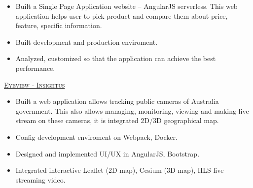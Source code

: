 \begin{cventries}
{\begin{itemize}
        \item {Built a Single Page Application website – AngularJS serverless. This web application helps user to pick product and compare them about price, feature, specific information.}
        \item {Built development and production enviroment.}
        \item {Analyzed, customized so that the application can achieve the best performance.}
      \end{itemize}
      \vspace{2mm}\hspace{5mm}\faTasks\hspace{1mm}{\fontsize{8pt}{1em}\bodyfont\scshape\color{graytext} {Project}} {\fontsize{9pt}{1em}\bodyfont\scshape\color{awesome} \href{http://insightus.com.au/eyeview/}{Eyeview - Insightus}}
      \begin{itemize}
        \item {Built a web application allows tracking public cameras of Australia government. This also allows managing, monitoring, viewing and making live stream on these cameras, it is integrated 2D/3D geographical map.}
        \item {Config development enviroment on Webpack, Docker.}
        \item {Designed and implemented UI/UX in AngularJS, Bootstrap.}
        \item {Integrated interactive Leaflet (2D map), Cesium (3D map), HLS live streaming video.}
      \end{itemize}
    }
\end{cventries}

